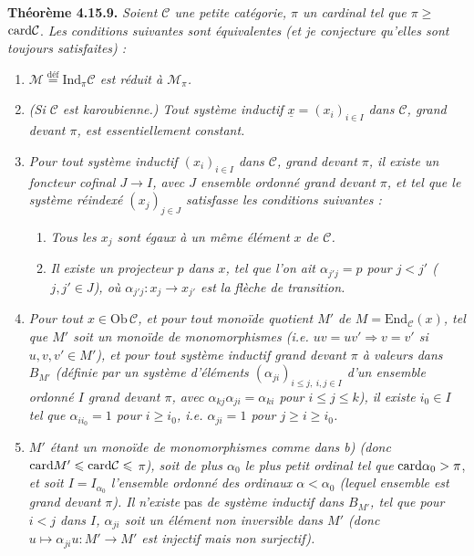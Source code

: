 \textbf{Théorème 4.15.9.} \textit{Soient $\mathcal{C}$ une petite catégorie, $\pi$ un cardinal tel que $\pi \geqslant$} $\mathrm{card}\mathcal{C}$. \textit{Les conditions suivantes sont équivalentes (et je conjecture qu'elles sont toujours satisfaites) :}
\begin{enumerate}[nosep]
\item[\textit{a)}] \textit{$\mathcal{M} \overset{\text{déf}}{=} \mathrm{Ind}_\pi\mathcal{C}$ est réduit à $\mathcal{M}_\pi$.}
\item[\textit{a$'$)}] \textit{(Si $\mathcal{C}$ est karoubienne.) Tout système inductif $\underline{x} = (x_i)_{i\in I}$ dans $\mathcal{C}$, grand devant $\pi$, est essentiellement constant.}
\item[\textit{a$''$)}] \textit{Pour tout système inductif $(x_i)_{i\in I}$ dans $\mathcal{C}$, grand devant $\pi$, il existe un foncteur cofinal $J \longrightarrow I$, avec $J$ ensemble ordonné grand devant $\pi$, et tel que le système réindexé $(x_j)_{j\in J}$ satisfasse les conditions suivantes :}
\begin{enumerate}[nosep]
\item[\textit{1)}] \textit{Tous les $x_j$ sont égaux à un même élément $x$ de $\mathcal{C}$.}
\item[\textit{2)}] \textit{Il existe un projecteur $p$ dans $x$, tel que l'on ait $\alpha_{j'j} = p$ pour $j < j'$ ($j,j' \in J$), où $\alpha_{j'j} : x_j \longrightarrow x_{j'}$ est la flèche de transition.}
\end{enumerate}
\item[\textit{b)}] \textit{Pour tout $x \in \mathrm{Ob}\,\mathcal{C}$, et pour tout monoïde quotient $M'$ de $M = \mathrm{End}_{\mathcal{C}}(x)$, tel que $M'$ soit un monoïde de monomorphismes (i.e. $uv = uv' \Longrightarrow v = v'$ si $u,v,v' \in M'$), et pour tout système inductif grand devant $\pi$ à valeurs dans $B_{M'}$ (définie par un système d'éléments $(\alpha_{ji})_{i\leqslant j,\ i,j\in I}$ d'un ensemble ordonné $I$ grand devant $\pi$, avec $\alpha_{kj}\alpha_{ji} = \alpha_{ki}$ pour $i \leqslant j \leqslant k$), il existe $i_0 \in I$ tel}
\textit{que $\alpha_{ii_0} = 1$ pour $i \geqslant i_0$, i.e. $\alpha_{ji} = 1$ pour $j \geqslant i \geqslant i_0$.}
\item[\textit{b$'$)}] \textit{$M'$ étant un monoïde de monomorphismes comme dans b) (donc} $\mathrm{card} M' \leqslant \mathrm{card}\mathcal{C} \leqslant$ \textit{$\pi$), soit de plus $\alpha_0$ le plus petit ordinal tel que} $\mathrm{card}\alpha_0 > \pi$, \textit{et soit $I = I_{\alpha_0}$ l'ensemble ordonné des ordinaux $\alpha < \alpha_0$ (lequel ensemble est grand devant $\pi$). Il n'existe} pas \textit{de système inductif dans $B_{M'}$, tel que pour $i < j$ dans $I$, $\alpha_{ji}$ soit un élément non inversible dans $M'$ (donc $u \longmapsto \alpha_{ji}u : M' \longrightarrow M'$ est injectif mais non surjectif).}
\end{enumerate}

